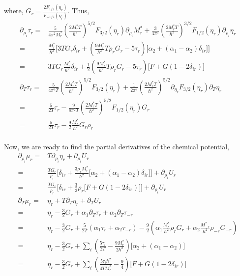 \documentclass[preprint,prc,preprintnumbers,superscriptaddress,amsmath,amssymb,floatfix]{revtex4-1}
\begin{document}
where, $G_r = \frac{2 F_{1/2}(\eta_r)}{F_{-1/2}(\eta_r)}$.
Thus,
\begin{equation}
 \begin{split}
 \partial_{\rho_i}\tau_r=&\frac{5}{4\pi^2 M^{*}_r}(\frac{2 M_r^{*}T}{\hbar^2})^{5/2}F_{3/2}(\eta_r)\partial_{\rho_i}M^{*}_r+\frac{3}{4\pi^2}(\frac{2 M_r^{*}T}{\hbar^2})^{3/2}F_{1/2}(\eta_r)\partial_{\rho_i}\eta_r\\
 =&\frac{M_r^{*}}{\hbar^2}\Big[3 T G_r \delta_{ir} +(\frac{9 M_r^{*}}{\hbar^2} T \rho_r G_r - 5 \tau_r)\big[\alpha_2+(\alpha_1-\alpha_2)\delta_{ir}\big] \Big]\\
  =&3 T G_r\frac{M_r^{*}}{\hbar^2} \delta_{ir} +\frac{1}{2}(\frac{9 M_r^{*}}{\hbar^2} T \rho_r G_r - 5 \tau_r)\big[F+G(1-2\delta_{ir})\big]\\
  \partial_{T}\tau_r=&\frac{5}{4\pi^2 T}(\frac{2 M^{*}_rT}{\hbar^2})^{5/2} F_{3/2}(\eta_r)+\frac{1}{2\pi^2}(\frac{2 M_r^{*}T}{\hbar^2})^{5/2}\partial_{\eta_r}F_{3/2}(\eta_r)\partial_{T}\eta_r\\
  =&\frac{5}{2T}\tau_r-\frac{9}{8\pi^2 T}(\frac{2 M^{*}_rT}{\hbar^2})^{5/2} F_{1/2}(\eta_r)G_r\\
  =&\frac{5}{2T}\tau_r-\frac{9}{2}\frac{M_r^{*}}{\hbar^2}G_r\rho_r\\
 \end{split}
\end{equation}

Now, we are ready to find the partial derivatives of the chemical potential,
\begin{equation}
 \begin{split}
  \partial_{\rho_i}\mu_r =& T\partial_{\rho_i}\eta_r + \partial_{\rho_i} U_r\\
  =&\frac{TG_r}{\rho_r}\Big[\delta_{ir}+\frac{3 \rho_r M_r^{*}}{\hbar^2}\big[\alpha_2+(\alpha_1-\alpha_2)\delta_{ir}\big]\Big] + \partial_{\rho_i} U_r\\
  =&\frac{TG_r}{\rho_r}\Big[\delta_{ir}+\frac{3}{2}\rho_r\big[F+G(1-2\delta_{ir})\big]\Big] + \partial_{\rho_i} U_r\\
  \partial_{T}\mu_r=& \eta_r + T \partial_{T}\eta_r +\partial_{T}U_r\\
  =&\eta_r - \frac{3}{2}G_r+\alpha_1 \partial_{T}\tau_r+\alpha_2 \partial_{T}\tau_{-r}\\
  =&\eta_r - \frac{3}{2}G_r+\frac{5}{2T}(\alpha_1\tau_r+\alpha_2\tau_{-r})- \frac{9}{2} (\alpha_1 \frac{M_r^{*}}{\hbar^2}\rho_r G_r+\alpha_2 \frac{M_{-r}^{*}}{\hbar^2}\rho_{-r} G_{-r})\\
  =&\eta_r - \frac{3}{2}G_r+\sum_i (\frac{5\tau_i}{2T}-\frac{9M_r^{*}}{2 \hbar^2}) \big[\alpha_2+(\alpha_1-\alpha_2)\big]\\
  =&\eta_r - \frac{3}{2}G_r+\sum_i (\frac{5\tau_i \hbar^2}{4TM_r^{*}}-\frac{9}{4}) \big[F+G(1-2\delta_{ir})\big]
 \end{split}
\end{equation}
\end{document}
